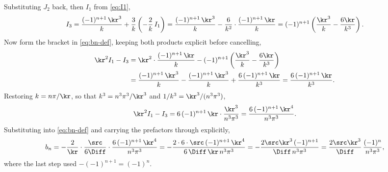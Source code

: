 %
Substituting $J_{2}$ back, then $I_{1}$ from \cref{eq:I1},
%
\begin{equation}
  I_{3}
  = \frac{(-1)^{n+1}\,\kr^{3}}{k} + \frac{3}{k}\left( -\frac{2}{k}\,I_{1} \right)
  = \frac{(-1)^{n+1}\,\kr^{3}}{k}
   - \frac{6}{k^{2}}\cdot\frac{(-1)^{n+1}\,\kr}{k}
  = (-1)^{n+1}\left( \frac{\kr^{3}}{k} - \frac{6\kr}{k^{3}} \right) .
\end{equation}
%
Now form the bracket in \cref{eq:bn-def}, keeping both products explicit before
cancelling,
%
\begin{align}
  \kr^{2} I_{1} - I_{3}
  &= \kr^{2}\cdot\frac{(-1)^{n+1}\,\kr}{k}
   - (-1)^{n+1}\left( \frac{\kr^{3}}{k} - \frac{6\kr}{k^{3}} \right) \notag \\
  &= \frac{(-1)^{n+1}\,\kr^{3}}{k}
   - \frac{(-1)^{n+1}\,\kr^{3}}{k}
   + \frac{6\,(-1)^{n+1}\,\kr}{k^{3}}
  = \frac{6\,(-1)^{n+1}\,\kr}{k^{3}} .
\end{align}
%
Restoring $k = n\pi/\kr$, so that $k^{3} = n^{3}\pi^{3}/\kr^{3}$ and
$1/k^{3} = \kr^{3}/(n^{3}\pi^{3})$,
%
\begin{equation}
  \kr^{2} I_{1} - I_{3}
  = 6\,(-1)^{n+1}\,\kr \cdot \frac{\kr^{3}}{n^{3}\pi^{3}}
  = \frac{6\,(-1)^{n+1}\,\kr^{4}}{n^{3}\pi^{3}} .
\end{equation}
%
Substituting into \cref{eq:bn-def} and carrying the prefactors through explicitly,
%
\begin{equation}
  b_{n}
  = -\frac{2}{\kr}\cdot\frac{\src}{6\Diff}\cdot
    \frac{6\,(-1)^{n+1}\,\kr^{4}}{n^{3}\pi^{3}}
  = -\frac{2 \cdot 6 \cdot \src\,(-1)^{n+1}\,\kr^{4}}
        {6\,\Diff\,\kr\, n^{3}\pi^{3}}
  = -\frac{2\src\kr^{3}\,(-1)^{n+1}}{\Diff\, n^{3}\pi^{3}}
  = \frac{2\src\kr^{3}}{\Diff}\,\frac{(-1)^{n}}{n^{3}\pi^{3}} ,
  \label{eq:coeffs}
\end{equation}
%
where the last step used $-(-1)^{n+1} = (-1)^{n}$.

